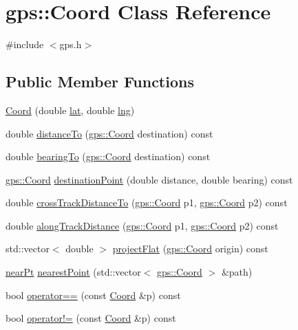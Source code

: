 \hypertarget{classgps_1_1Coord}{}\section{gps\+:\+:Coord Class Reference}
\label{classgps_1_1Coord}


{\ttfamily \#include $<$gps.\+h$>$}

\subsection*{Public Member Functions}
\begin{DoxyCompactItemize}
\item 
\hyperlink{classgps_1_1Coord_afcc45fae837b48cd7d9bd545c4dc574c}{Coord} (double \hyperlink{classgps_1_1Coord_a17cbbd7580a83c42f650b8f93e14d98e}{lat}, double \hyperlink{classgps_1_1Coord_abca98aaabe2dc3cf50ebdd687c2f47e8}{lng})
\item 
double \hyperlink{classgps_1_1Coord_a24d3b9899dc262a40728f7e343781ab6}{distance\+To} (\hyperlink{classgps_1_1Coord}{gps\+::\+Coord} destination) const
\item 
double \hyperlink{classgps_1_1Coord_a304e6cb56296d8d945310d7b931fca4e}{bearing\+To} (\hyperlink{classgps_1_1Coord}{gps\+::\+Coord} destination) const
\item 
\hyperlink{classgps_1_1Coord}{gps\+::\+Coord} \hyperlink{classgps_1_1Coord_a774fc85267d9cd3d01d151e784f1112c}{destination\+Point} (double distance, double bearing) const
\item 
double \hyperlink{classgps_1_1Coord_a2d421b8235201290c2a7c5d13eba097e}{cross\+Track\+Distance\+To} (\hyperlink{classgps_1_1Coord}{gps\+::\+Coord} p1, \hyperlink{classgps_1_1Coord}{gps\+::\+Coord} p2) const
\item 
double \hyperlink{classgps_1_1Coord_a69ead8580e270f1319d9bbf3da680d45}{along\+Track\+Distance} (\hyperlink{classgps_1_1Coord}{gps\+::\+Coord} p1, \hyperlink{classgps_1_1Coord}{gps\+::\+Coord} p2) const
\item 
std\+::vector$<$ double $>$ \hyperlink{classgps_1_1Coord_a43b8263439170e923db7b21a32b653f8}{project\+Flat} (\hyperlink{classgps_1_1Coord}{gps\+::\+Coord} origin) const
\item 
\hyperlink{structgps_1_1nearPt}{near\+Pt} \hyperlink{classgps_1_1Coord_a4b7faf8c9e2b4196bcbb450b5448c36f}{nearest\+Point} (std\+::vector$<$ \hyperlink{classgps_1_1Coord}{gps\+::\+Coord} $>$ \&path)
\item 
bool \hyperlink{classgps_1_1Coord_a254245e5cdfbac96a1c6e0332f2d65fb}{operator==} (const \hyperlink{classgps_1_1Coord}{Coord} \&p) const
\item 
bool \hyperlink{classgps_1_1Coord_ad832b140a8a39355874e268834d078cd}{operator!=} (const \hyperlink{classgps_1_1Coord}{Coord} \&p) const
\end{DoxyCompactItemize}
